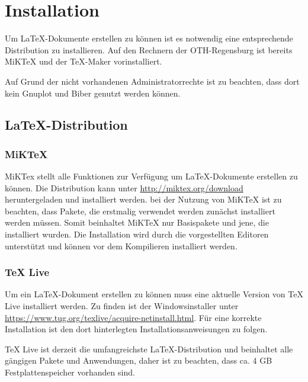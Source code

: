 

		\section{Installation}
		\label{ch:installation}
		Um \LaTeX-Dokumente erstellen zu können ist es notwendig eine entsprechende Distribution zu installieren. Auf den Rechnern der OTH-Regensburg ist bereits MiKTeX und der TeX-Maker vorinstalliert.

		Auf Grund der nicht vorhandenen Administratorrechte ist zu beachten, dass dort kein Gnuplot und Biber genutzt werden können.

		\subsection{\LaTeX-Distribution}
		\subsubsection{MiKTeX}
		MiKTex stellt alle Funktionen zur Verfügung um \LaTeX-Dokumente erstellen zu können. Die Distribution kann unter \url{http://miktex.org/download} heruntergeladen und installiert werden. bei der Nutzung von MiKTeX ist zu beachten, dass Pakete, die erstmalig verwendet werden zunächst installiert werden müssen. Somit beinhaltet MiKTeX nur Basispakete und jene, die installiert wurden. Die Installation wird durch die vorgestellten Editoren unterstützt und können vor dem Kompilieren installiert werden.

		\subsubsection{TeX Live}
		\label{ch:texlive}
		Um ein \LaTeX-Dokument erstellen zu können muss eine aktuelle Version von TeX Live installiert werden. Zu finden ist der Windowsinstaller unter \url{https://www.tug.org/texlive/acquire-netinstall.html}. Für eine korrekte Installation ist den dort hinterlegten Installationsanweisungen zu folgen.

		TeX Live ist derzeit die umfangreichste \LaTeX-Distribution und beinhaltet alle gängigen Pakete und Anwendungen, daher ist zu beachten, dass ca. 4 GB Festplattenspeicher vorhanden sind.




